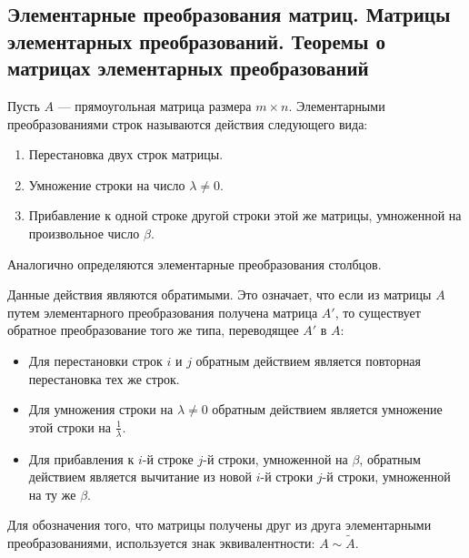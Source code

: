 \subsection{Элементарные преобразования матриц. Матрицы элементарных преобразований. Теоремы о матрицах элементарных преобразований}

\begin{definition}
Пусть $A$ — прямоугольная матрица размера $m \times n$. Элементарными преобразованиями строк называются действия следующего вида:
\begin{enumerate}
    \item Перестановка двух строк матрицы.
    \item Умножение строки на число $\lambda \neq 0$.
    \item Прибавление к одной строке другой строки этой же матрицы, умноженной на произвольное число $\beta$.
\end{enumerate}
Аналогично определяются элементарные преобразования столбцов.
\end{definition}

Данные действия являются обратимыми. Это означает, что если из матрицы $A$ путем элементарного преобразования получена матрица $A'$, то существует обратное преобразование того же типа, переводящее $A'$ в $A$:
\begin{itemize}
    \item Для перестановки строк $i$ и $j$ обратным действием является повторная перестановка тех же строк.
    \item Для умножения строки на $\lambda \neq 0$ обратным действием является умножение этой строки на $\frac{1}{\lambda}$.
    \item Для прибавления к $i$-й строке $j$-й строки, умноженной на $\beta$, обратным действием является вычитание из новой $i$-й строки $j$-й строки, умноженной на ту же $\beta$.
\end{itemize}

Для обозначения того, что матрицы получены друг из друга элементарными преобразованиями, используется знак эквивалентности: $A \sim \tilde{A}$.

